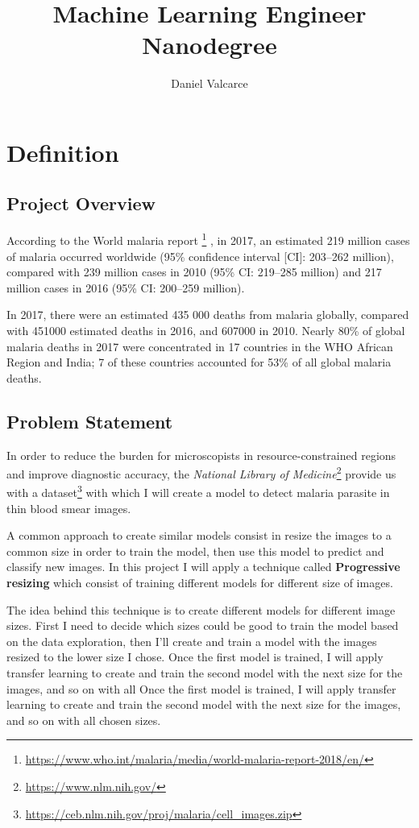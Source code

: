 \documentclass{article}
\title{Machine Learning Engineer Nanodegree}
\author{Daniel Valcarce}
\begin{document}
	\maketitle
	\newpage
	
	\section{Definition}
	\subsection{Project Overview}
	According to the World malaria report \footnote{\label{malaria_report}\url{https://www.who.int/malaria/media/world-malaria-report-2018/en/}} , in 2017, an estimated 219 million cases of malaria
	occurred worldwide (95\% confidence interval [CI]: 203–262 million), compared with 239
	million cases in 2010 (95\% CI: 219–285 million) and 217 million cases in 2016 (95\% CI: 200–259
	million).
	
	\medskip
	In 2017, there were an estimated 435 000 deaths from malaria globally, compared with
	451000 estimated deaths in 2016, and 607000 in 2010. Nearly 80\% of global malaria deaths in
	2017 were concentrated in 17 countries in the WHO African Region and India; 7 of these
	countries accounted for 53\% of all global malaria deaths.

	\subsection{Problem Statement}
	In order to reduce the burden for microscopists in resource-constrained regions and improve
	diagnostic accuracy, the \textit{National Library of Medicine}\footnote{\label{nlm_web}\url{https://www.nlm.nih.gov/}} provide us with a dataset\footnote{\label{dataset}\url{https://ceb.nlm.nih.gov/proj/malaria/cell_images.zip}} with which I
	will create a model to detect malaria parasite in thin blood smear images.
	
	\medskip
	A common approach to create similar models consist in resize the images to a common size in order to train the model, then use this model to predict and classify new images. In this project I will apply a technique called \textbf{Progressive resizing} which consist of training different models for different size of images.
	
	\medskip
	The idea behind this technique is to create different models for different image sizes. First I need to decide which sizes could be good to train the model based on the data exploration, then I'll create and train a model with the images resized to the lower size I chose. Once the first model is trained, I will apply transfer learning to create and train the second model with the next size for the images, and so on with all Once the first model is trained, I will apply transfer learning to create and train the second model with the next size for the images, and so on with all chosen sizes.
	
\end{document}
